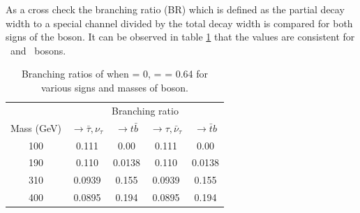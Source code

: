 As a cross check the branching ratio (BR) which is defined as the partial decay width to a special channel divided by the total decay width is compared for both signs of the \wprime boson. 
It can be observed in table \ref{tab:W'BR} that the values are consistent for \wprimep ~and \wprimem ~bosons. 
\begin{table}[htb]
	\centering
	\caption{Branching ratios of \wprime  when \gR = 0, \gL = \gSM = 0.64 for various signs and masses of \wprime boson. \label{tab:W'BR} }
	\begin{tabular}{|c|c|c|c|c|}
		\hline 
		                   & \multicolumn{4}{c|}{Branching ratio}\\\cline{2-5}
		\wprime Mass (GeV) &   \wprimep $\rightarrow \bar{\tau},\nu_\tau $&   \wprimep$\rightarrow  t \bar{b}$ &   \wprimem$\rightarrow \tau,\bar{\nu}_\tau $ &  \wprimem$\rightarrow  \bar{t}b $ \\
		\hline 
		100  & 0.111  & 0.00   & 0.111  & 0.00\\
		190  & 0.110  & 0.0138 & 0.110  & 0.0138\\
		310  & 0.0939 & 0.155  & 0.0939 & 0.155\\
		400  & 0.0895 & 0.194  & 0.0895 & 0.194\\
		\hline
	\end{tabular}
\end{table}

